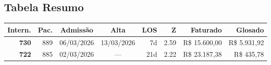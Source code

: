 \documentclass[a4paper,10pt]{article}
\begin{document}
\subsection{Tabela Resumo}
\begin{center}
\begin{longtable}{>{\scriptsize}r>{\scriptsize}r>{\scriptsize}c>{\scriptsize}c>{\scriptsize}r>{\scriptsize}r>{\scriptsize}r>{\scriptsize}r}
\toprule
\textbf{Intern.} & \textbf{Pac.} & \textbf{Admiss\~{a}o} & \textbf{Alta} & \textbf{LOS} & \textbf{Z} & \textbf{Faturado} & \textbf{Glosado} \\
\midrule
\endhead
\bottomrule
\endfoot

\textcolor{anomyellow}{\textbf{730}} & 889 & 06/03/2026 & 13/03/2026 & 7d & \textcolor{anomyellow}{2.59} & R\$ 15.600,00 & \textcolor{anomred}{R\$ 5.931,92} \\

\textcolor{anomyellow}{\textbf{722}} & 885 & 02/03/2026 & — & 21d & \textcolor{anomyellow}{2.22} & R\$ 23.187,38 & \textcolor{anomred}{R\$ 435,78} \\

\end{longtable}\end{center}
\end{document}

